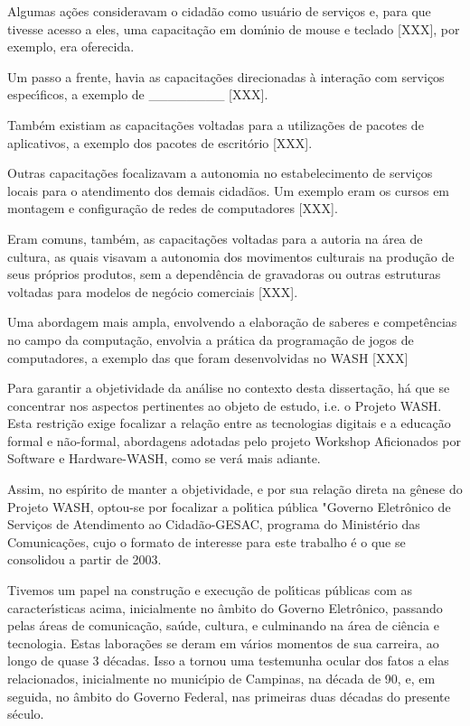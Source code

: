 \documentclass[
12pt,		%
openright,	%
twoside,  %
a4paper,			%
chapter=TITLE,		%
english,			%
french,				%
spanish,			%
brazil				%
]{USPSC-classe/USPSC}
\begin{document}
Algumas a\c{c}\~oes consideravam o cidad\~ao como usu\'ario de servi\c{c}os e, para que tivesse acesso a eles, uma capacita\c{c}\~ao em dom\'{\i}nio de mouse e teclado [XXX], por exemplo, era oferecida.


Um passo a frente, havia as capacita\c{c}\~oes direcionadas \`a intera\c{c}\~ao com servi\c{c}os espec\'{\i}ficos, a exemplo de \_\_\_\_\_\_\_\_ [XXX].


Tamb\'em existiam as capacita\c{c}\~oes voltadas para a utiliza\c{c}\~oes de pacotes de aplicativos, a exemplo dos pacotes de escrit\'orio [XXX].


Outras capacita\c{c}\~oes focalizavam a autonomia no estabelecimento de servi\c{c}os locais para o atendimento dos demais cidad\~aos. Um exemplo eram os cursos em montagem e configura\c{c}\~ao de redes de computadores [XXX].


Eram comuns, tamb\'em, as capacita\c{c}\~oes voltadas para a autoria na \'area de cultura, as quais visavam a autonomia dos movimentos culturais na produ\c{c}\~ao de seus pr\'oprios produtos, sem a depend\^encia de gravadoras ou outras estruturas voltadas para modelos de neg\'ocio comerciais [XXX].


Uma abordagem mais ampla, envolvendo a elabora\c{c}\~ao de saberes e compet\^encias no campo da computa\c{c}\~ao, envolvia a pr\'atica da programa\c{c}\~ao de jogos de computadores, a exemplo das que foram desenvolvidas no WASH [XXX]


Para garantir a objetividade da an\'alise no contexto desta disserta\c{c}\~ao, h\'a que se concentrar nos aspectos pertinentes ao objeto de estudo, i.e. o Projeto WASH. Esta restri\c{c}\~ao exige focalizar a rela\c{c}\~ao entre as tecnologias digitais e a educa\c{c}\~ao formal e n\~ao-formal, abordagens adotadas pelo projeto Workshop Aficionados por Software e Hardware-WASH, como se ver\'a mais adiante.


Assim, no esp\'{\i}rito de manter a objetividade, e por sua rela\c{c}\~ao direta na g\^enese do Projeto WASH, optou-se por focalizar a pol\'{\i}tica p\'ublica "Governo Eletr\^onico de Servi\c{c}os de Atendimento ao Cidad\~ao-GESAC, programa do  Minist\'erio das Comunica\c{c}\~oes, cujo o formato de interesse para este trabalho \'e o que se consolidou a partir de 2003.


Tivemos um papel na constru\c{c}\~ao e execu\c{c}\~ao de pol\'{\i}ticas p\'ublicas com as caracter\'{\i}sticas acima, inicialmente no \^ambito do Governo Eletr\^onico, passando pelas \'areas de comunica\c{c}\~ao, sa\'ude, cultura, e culminando na \'area de ci\^encia e tecnologia. Estas labora\c{c}\~oes  se deram em v\'arios momentos de sua carreira, ao longo de quase 3 d\'ecadas. Isso a tornou uma testemunha ocular dos fatos a elas relacionados, inicialmente no  munic\'{\i}pio de Campinas, na d\'ecada de 90, e, em seguida, no \^ambito do Governo Federal, nas primeiras duas d\'ecadas do presente s\'eculo.
\end{document}
